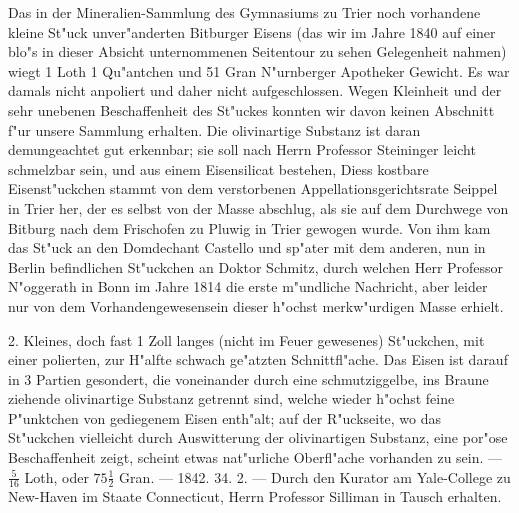 \documentclass[a4paper, 11pt, oneside, polutonikogreek, german]{article}
\begin{document}
\setlength{\leftskip}{10mm}
\setlength{\parindent}{0pt}

{\footnotesize Das in der Mineralien-Sammlung des Gymnasiums zu Trier noch vorhandene kleine St"uck unver"anderten Bitburger Eisens (das wir im Jahre 1840 auf einer blo"s in dieser Absicht unternommenen Seitentour zu sehen Gelegenheit nahmen) wiegt 1 Loth 1 Qu"antchen und 51 Gran N"urnberger Apotheker Gewicht. Es war damals nicht anpoliert und daher nicht aufgeschlossen. Wegen Kleinheit und der sehr unebenen Beschaffenheit des St"uckes konnten wir davon keinen Abschnitt f"ur unsere Sammlung erhalten. Die olivinartige Substanz ist daran demungeachtet gut erkennbar; sie soll nach Herrn Professor Steininger leicht schmelzbar sein, und aus einem Eisensilicat bestehen, Diess kostbare Eisenst"uckchen stammt von dem verstorbenen Appellationsgerichtsrate Seippel in Trier her, der es selbst von der Masse abschlug, als sie auf dem Durchwege von Bitburg nach dem Frischofen zu Pluwig in Trier gewogen wurde. Von ihm kam das St"uck an den Domdechant Castello und sp"ater mit dem anderen, nun in Berlin befindlichen St"uckchen an Doktor Schmitz, durch welchen Herr Professor N"oggerath in Bonn im Jahre 1814 die erste m"undliche Nachricht, aber leider nur von dem Vorhandengewesensein dieser h"ochst merkw"urdigen Masse erhielt.}

\setlength{\leftskip}{0pt}
\setlength{\parindent}{20pt}

2. Kleines, doch fast 1 Zoll langes (nicht im Feuer gewesenes) St"uckchen, mit einer polierten, zur H"alfte schwach ge"atzten Schnittfl"ache. Das Eisen ist darauf in 3 Partien gesondert, die voneinander durch eine schmutziggelbe, ins Braune ziehende olivinartige Substanz getrennt sind, welche wieder h"ochst feine P"unktchen von gediegenem Eisen enth"alt; auf der R"uckseite, wo das St"uckchen vielleicht durch Auswitterung der olivinartigen Substanz, eine por"ose Beschaffenheit zeigt, scheint etwas nat"urliche Oberfl"ache vorhanden zu sein. --- $\frac{5}{16}$ Loth, oder $75\frac{1}{2}$ Gran. --- 1842. 34. 2. --- Durch den Kurator am Yale-College zu New-Haven im Staate Connecticut, Herrn Professor Silliman in Tausch erhalten.

\setlength{\leftskip}{10mm}
\setlength{\parindent}{0pt}
\end{document}
